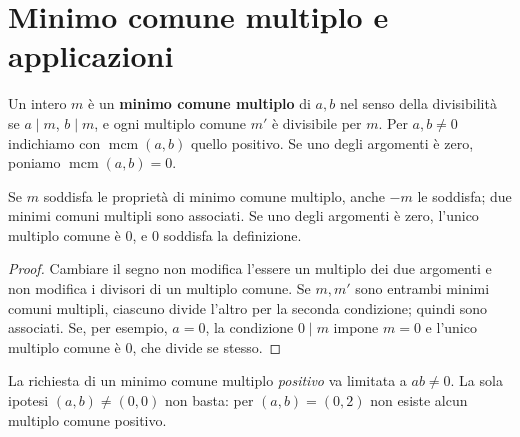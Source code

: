 \section{Minimo comune multiplo e applicazioni}
\begin{definizione}
Un intero $m$ è un \textbf{minimo comune multiplo} di $a,b$ nel senso della divisibilità se $a\mid m$, $b\mid m$, e ogni multiplo comune $m'$ è divisibile per $m$. Per $a,b\ne0$ indichiamo con $\operatorname{mcm}(a,b)$ quello positivo. Se uno degli argomenti è zero, poniamo $\operatorname{mcm}(a,b)=0$.
\end{definizione}

\begin{proposizione}
Se $m$ soddisfa le proprietà di minimo comune multiplo, anche $-m$ le soddisfa; due minimi comuni multipli sono associati. Se uno degli argomenti è zero, l'unico multiplo comune è $0$, e $0$ soddisfa la definizione.
\end{proposizione}
\begin{proof}
Cambiare il segno non modifica l'essere un multiplo dei due argomenti e non modifica i divisori di un multiplo comune. Se $m,m'$ sono entrambi minimi comuni multipli, ciascuno divide l'altro per la seconda condizione; quindi sono associati. Se, per esempio, $a=0$, la condizione $0\mid m$ impone $m=0$ e l'unico multiplo comune è $0$, che divide se stesso.
\end{proof}

\begin{osservazione}
La richiesta di un minimo comune multiplo \emph{positivo} va limitata a $ab\ne0$. La sola ipotesi $(a,b)\ne(0,0)$ non basta: per $(a,b)=(0,2)$ non esiste alcun multiplo comune positivo.
\end{osservazione}

